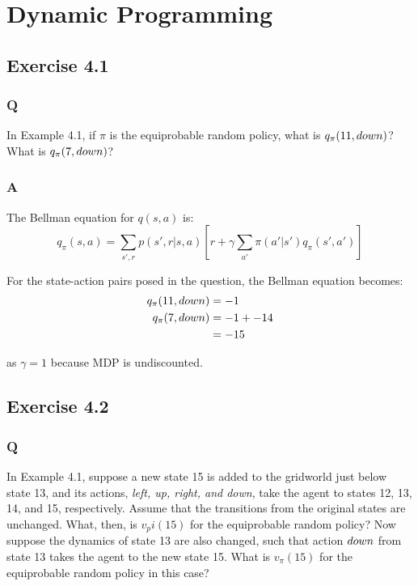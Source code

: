 \section{Dynamic Programming}

\subsection*{Exercise 4.1}
\subsubsection{Q}
In Example 4.1, if $\pi$ is the equiprobable random policy, what is $q_\pi(11, \mathnormal{down})$? What is $q_\pi(7, \mathnormal{down})$? 
\subsubsection{A}
The Bellman equation for $q(s,a)$ is:
\begin{equation}
q_\pi(s,a) = \sum_{s',r} p(s', r | s, a) \left[r + \gamma \sum_{a'} \pi(a' | s') q_\pi(s', a')\right]
\end{equation}

For the state-action pairs posed in the question, the Bellman equation becomes:
\begin{align}
q_\pi(11, \mathnormal{down}) &= -1 \\
q_\pi(7, \mathnormal{down}) &= -1 + -14 \\
&= -15 \\
\end{align}

as $\gamma = 1$ because MDP is undiscounted.

\subsection*{Exercise 4.2}
\subsubsection{Q}
In Example 4.1, suppose a new state 15 is added to the gridworld just below state 13, and its actions, \textit{left, up, right, and down}, take the agent to states 12, 13, 14, and 15, respectively. Assume that the transitions from the original states are unchanged. What, then, is $v_pi(15)$ for the equiprobable random policy? Now suppose the dynamics of state 13 are also changed, such that action $\mathnormal{down}$ from state 13 takes the agent to the new state 15. What is $v_\pi(15)$ for the equiprobable random policy in this case?

